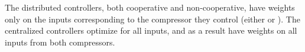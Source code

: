 


The distributed controllers, both cooperative and non-cooperative, have weights only on the inputs corresponding to the compressor they control (either  or ).
The centralized controllers optimize for all inputs, and as a result have weights on all inputs from both compressors.

